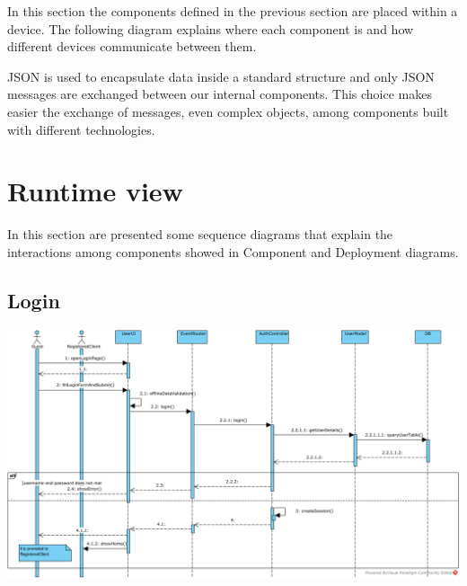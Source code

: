 In this section the components defined in the previous section are placed within a device.
The following diagram explains where each component is and how  different devices communicate between them.

JSON is used to encapsulate data inside a standard structure and only JSON messages are exchanged between our internal components.
This choice makes easier the exchange of messages, even complex objects, among components built with different technologies.

\section{Runtime view}
In this section are presented some sequence diagrams that explain the interactions among components showed in Component and Deployment diagrams.

\subsection{Login}
\includegraphics[width=\textwidth, keepaspectratio]{../images/architectural_design/rv_login.png}

